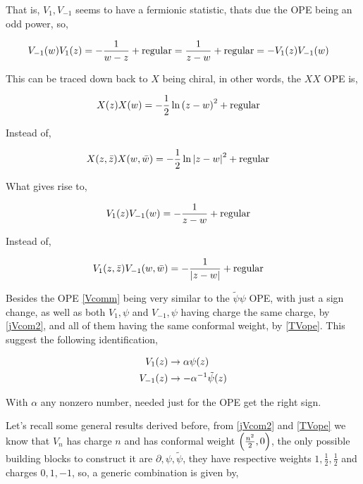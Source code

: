 That is, $V_1,V_{-1}$ seems to have a fermionic statistic, thats due the OPE being an odd power, so,

\begin{align*}
    V_{-1}\qty(w)V_{1}\qty(z)&=-\frac{1}{w-z}+\textnormal{regular}=\frac{1}{z-w}+\textnormal{regular}=-V_1\qty(z)V_{-1}\qty(w)
\end{align*}

This can be traced down back to $X$ being chiral, in other words, the $XX$ OPE is,

\begin{align*}
    X\qty(z)X\qty(w)&=-\frac12\ln\qty(z-w)^2+\textnormal{regular}
\end{align*}

Instead of,

\begin{align*}
    X\qty(z,\bar z)X\qty(w,\bar w)&=-\frac12\ln\abs{z-w}^2+\textnormal{regular}
\end{align*}

What gives rise to,

\begin{align*}
    V_1\qty(z)V_{-1}\qty(w)&=-\frac{1}{z-w}+\textnormal{regular}
\end{align*}

Instead of,

\begin{align*}
    V_1\qty(z,\bar z)V_{-1}\qty(w,\bar w)&=-\frac{1}{\abs{z-w}}+\textnormal{regular}
\end{align*}

Besides the OPE \ref{Vcomm} being very similar to the $\tilde\psi\psi$ OPE, with just a sign change, as well as 
both $V_1,\psi$ and $V_{-1},\psi$ having charge the same charge, by \ref{jVcom2}, and all of them having the same conformal weight, 
by \ref{TVope}. This suggest the following identification,

\begin{align*}
    V_1\qty(z)&\rightarrow\alpha\psi\qty(z)\\
    V_{-1}\qty(z)&\rightarrow-\alpha^{-1}\tilde\psi\qty(z)
\end{align*}

With $\alpha$ any nonzero number, needed just for the OPE get the right sign.

\probitem{}

Let's recall some general results derived before, from \ref{jVcom2} and \ref{TVope} we know that $V_n$ has 
charge $n$ and has conformal weight $\qty(\frac{n^2}{2},0)$, the only possible building blocks to construct it 
are $\partial,\psi,\tilde\psi$, they have respective weights $1,\frac12,\frac12$ and charges $0,1,-1$, so, a generic 
combination is given by,

